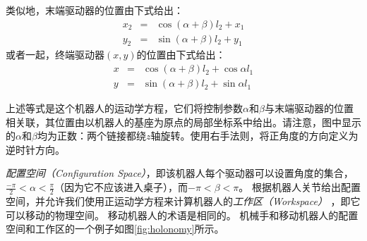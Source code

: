 类似地，末端驱动器的位置由下式给出：
\begin{eqnarray}
x_2&=&\cos(\alpha+\beta)l_2+x_1\\
y_2&=&\sin(\alpha+\beta)l_2+y_1
\end{eqnarray}
%
或者一起，终端驱动器$(x, y)$的位置由下式给出：
\begin{eqnarray}\label{eq:cosx}
x&=&\cos(\alpha+\beta)l_2+\cos\alpha l_1\\
y&=&\sin(\alpha+\beta)l_2+\sin\alpha l_1
\end{eqnarray}


上述等式是这个机器人的运动学方程，它们将控制参数$\alpha$和$\beta$与末端驱动器的位置相关联，其位置由以机器人的基座为原点的局部坐标系中给出。请注意，图中显示的$\alpha$和$\beta$均为正数：两个链接都绕$z$轴旋转。使用右手法则，将正角度的方向定义为逆时针方向。


\emph{配置空间（Configuration Space）}，即该机器人每个驱动器可以设置角度的集合，$\frac{-\pi}{2} <\alpha <\frac{\pi}{2}$（因为它不应该进入桌子），而$-\pi <\beta <\pi$。 根据机器人关节给出配置空间，并允许我们使用正运动学方程来计算机器人的\emph{工作区（Workspace）} ，即它可以移动的物理空间。 移动机器人的术语是相同的。 机械手和移动机器人的配置空间和工作区的一个例子如图\ref{fig:holonomy}所示。

